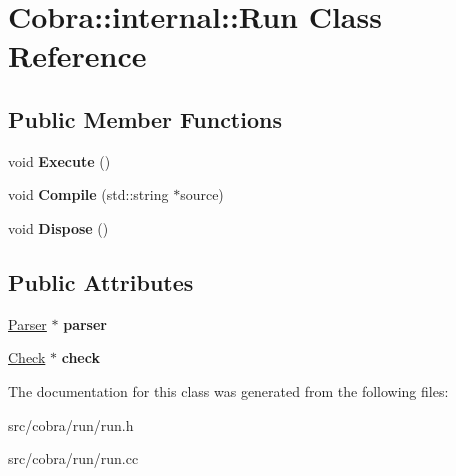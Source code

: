 \hypertarget{class_cobra_1_1internal_1_1_run}{\section{Cobra\+:\+:internal\+:\+:Run Class Reference}
\label{class_cobra_1_1internal_1_1_run}
}
\subsection*{Public Member Functions}
\begin{DoxyCompactItemize}
\item 
\hypertarget{class_cobra_1_1internal_1_1_run_a2fb2e0933565f9224ff328a96af70556}{void {\bfseries Execute} ()}\label{class_cobra_1_1internal_1_1_run_a2fb2e0933565f9224ff328a96af70556}

\item 
\hypertarget{class_cobra_1_1internal_1_1_run_a6638793f845421c0f64912600d7a6909}{void {\bfseries Compile} (std\+::string $\ast$source)}\label{class_cobra_1_1internal_1_1_run_a6638793f845421c0f64912600d7a6909}

\item 
\hypertarget{class_cobra_1_1internal_1_1_run_acde0fdf7154bc2da57aa9aaf9e676d0c}{void {\bfseries Dispose} ()}\label{class_cobra_1_1internal_1_1_run_acde0fdf7154bc2da57aa9aaf9e676d0c}

\end{DoxyCompactItemize}
\subsection*{Public Attributes}
\begin{DoxyCompactItemize}
\item 
\hypertarget{class_cobra_1_1internal_1_1_run_a4d0a1a5f1f334249c28d73d59db0b965}{\hyperlink{class_cobra_1_1internal_1_1_parser}{Parser} $\ast$ {\bfseries parser}}\label{class_cobra_1_1internal_1_1_run_a4d0a1a5f1f334249c28d73d59db0b965}

\item 
\hypertarget{class_cobra_1_1internal_1_1_run_a3606edf19936859ba600f9185ed9d431}{\hyperlink{class_cobra_1_1internal_1_1_check}{Check} $\ast$ {\bfseries check}}\label{class_cobra_1_1internal_1_1_run_a3606edf19936859ba600f9185ed9d431}

\end{DoxyCompactItemize}


The documentation for this class was generated from the following files\+:\begin{DoxyCompactItemize}
\item 
src/cobra/run/run.\+h\item 
src/cobra/run/run.\+cc\end{DoxyCompactItemize}
